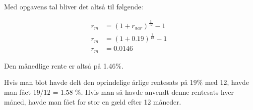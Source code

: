 \documentclass[a4paper, 12pt]{article}
\begin{document}
Med opgavens tal bliver det altså til følgende:

\begin{align*}
r_m  &=\left(1+r_{aar} \right)^{\frac{1}{12}} - 1 \\
r_m  &=\left(1+0.19 \right)^{\frac{1}{12}} - 1 \\
r_m  &=0.0146
\end{align*}

Den månedlige rente er altså på 1.46\%.

Hvis man blot havde delt den oprindelige årlige rentesats på 19\% med 12, havde man fået 19/12 = 1.58 \%. Hvis man så havde anvendt denne rentesats hver måned, havde man fået for stor en gæld efter 12 måneder.
\end{document}
